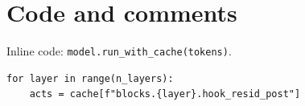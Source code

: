 \documentclass[11pt,a4paper]{article}
\begin{document}
\section{Code and comments}
\label{sec:helper-code}
Inline code: \verb|model.run_with_cache(tokens)|.
\begin{verbatim}
for layer in range(n_layers):
    acts = cache[f"blocks.{layer}.hook_resid_post"]
\end{verbatim}

\printbibliography
\end{document}
